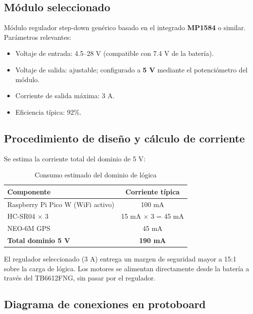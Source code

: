 \documentclass[12pt]{report}
\begin{document}
\subsection{Módulo seleccionado}

Módulo regulador step-down genérico basado en el integrado \textbf{MP1584} o similar. Parámetros relevantes:

\begin{itemize}
    \item Voltaje de entrada: 4.5--28 V (compatible con 7.4 V de la batería).
    \item Voltaje de salida: ajustable; configurado a \textbf{5 V} mediante el potenciómetro del módulo.
    \item Corriente de salida máxima: 3 A.
    \item Eficiencia típica: 92\%.
\end{itemize}

\subsection{Procedimiento de diseño y cálculo de corriente}

Se estima la corriente total del dominio de 5 V:

\begin{table}[H]
\centering
\renewcommand{\arraystretch}{1.3}
\begin{tabular}{|l|c|}
\hline
\textbf{Componente} & \textbf{Corriente típica} \\
\hline
Raspberry Pi Pico W (WiFi activo) & 100 mA \\
HC-SR04 × 3 & 15 mA × 3 = 45 mA \\
NEO-6M GPS & 45 mA \\
\hline
\textbf{Total dominio 5 V} & \textbf{190 mA} \\
\hline
\end{tabular}
\caption{Consumo estimado del dominio de lógica}
\end{table}

El regulador seleccionado (3 A) entrega un margen de seguridad mayor a 15:1 sobre la carga de lógica. Los motores se alimentan directamente desde la batería a través del TB6612FNG, sin pasar por el regulador.

\subsection{Diagrama de conexiones en protoboard}
\end{document}
